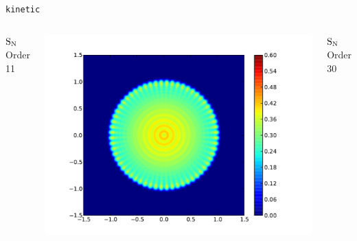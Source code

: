\documentclass{beamer}
\newcommand{\SN}{\ensuremath{\textnormal{S}_\textnormal{N}}\xspace}
\newcommand{\kinetic}{\texttt{kinetic}\xspace}
\begin{document}
\begin{frame}{\kinetic}
\begin{columns}
            \SN Order 11

            \centering
            \includegraphics[width=\textwidth]{S30-400.pdf}

            \SN Order 30
        \end{columns}
    \end{frame}
\end{document}
